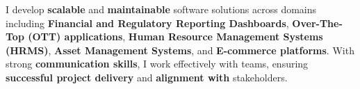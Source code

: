 \par{
I develop \textbf{scalable} and \textbf{maintainable} software solutions across domains including \textbf{Financial and Regulatory Reporting Dashboards}, \textbf{Over-The-Top (OTT) applications}, \textbf{Human Resource Management Systems (HRMS)}, \textbf{ Asset Management Systems}, and \textbf{E-commerce platforms}. With strong \textbf{communication skills}, I work effectively with teams, ensuring \textbf{successful project delivery} and \textbf{alignment with} stakeholders.
}

